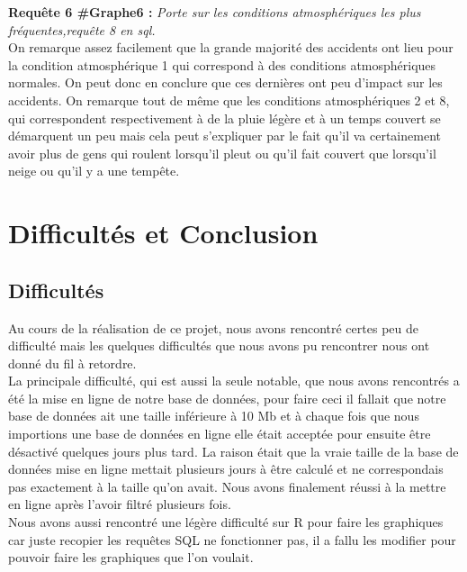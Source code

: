 \documentclass[mstat,12pt]{unswthesis}
\begin{document}
\medskip

\textbf{Requête 6 \#Graphe6 :} \emph{Porte sur les conditions
atmosphériques les plus fréquentes,requête 8 en sql.}\\
On remarque assez facilement que la grande majorité des accidents ont
lieu pour la condition atmosphérique 1 qui correspond à des conditions
atmosphériques normales. On peut donc en conclure que ces dernières ont
peu d'impact sur les accidents. On remarque tout de même que les
conditions atmosphériques 2 et 8, qui correspondent respectivement à de
la pluie légère et à un temps couvert se démarquent un peu mais cela
peut s'expliquer par le fait qu'il va certainement avoir plus de gens
qui roulent lorsqu'il pleut ou qu'il fait couvert que lorsqu'il neige ou
qu'il y a une tempête.

\hypertarget{difficultuxe9s-et-conclusion}{%
\chapter{Difficultés et Conclusion}\label{difficultuxe9s-et-conclusion}}

\hypertarget{difficultuxe9s}{%
\section{Difficultés}\label{difficultuxe9s}}

\medskip

Au cours de la réalisation de ce projet, nous avons rencontré certes peu
de difficulté mais les quelques difficultés que nous avons pu rencontrer
nous ont donné du fil à retordre.\\
La principale difficulté, qui est aussi la seule notable, que nous avons
rencontrés a été la mise en ligne de notre base de données, pour faire
ceci il fallait que notre base de données ait une taille inférieure à 10
Mb et à chaque fois que nous importions une base de données en ligne
elle était acceptée pour ensuite être désactivé quelques jours plus
tard. La raison était que la vraie taille de la base de données mise en
ligne mettait plusieurs jours à être calculé et ne correspondais pas
exactement à la taille qu'on avait. Nous avons finalement réussi à la
mettre en ligne après l'avoir filtré plusieurs fois.\\
Nous avons aussi rencontré une légère difficulté sur R pour faire les
graphiques car juste recopier les requêtes SQL ne fonctionner pas, il a
fallu les modifier pour pouvoir faire les graphiques que l'on voulait.
\end{document}
